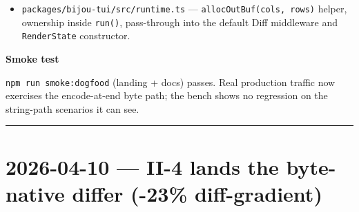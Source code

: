 \begin{itemize}
\item
  \texttt{p\allowbreak{}a\allowbreak{}c\allowbreak{}k\allowbreak{}a\allowbreak{}g\allowbreak{}e\allowbreak{}s\allowbreak{}/\allowbreak{}b\allowbreak{}i\allowbreak{}j\allowbreak{}o\allowbreak{}u\allowbreak{}-\allowbreak{}t\allowbreak{}u\allowbreak{}i\allowbreak{}/\allowbreak{}s\allowbreak{}r\allowbreak{}c\allowbreak{}/\allowbreak{}r\allowbreak{}u\allowbreak{}n\allowbreak{}t\allowbreak{}i\allowbreak{}m\allowbreak{}e\allowbreak{}.\allowbreak{}t\allowbreak{}s} --- \texttt{a\allowbreak{}l\allowbreak{}l\allowbreak{}o\allowbreak{}c\allowbreak{}O\allowbreak{}u\allowbreak{}t\allowbreak{}B\allowbreak{}u\allowbreak{}f\allowbreak{}(\allowbreak{}c\allowbreak{}o\allowbreak{}l\allowbreak{}s\allowbreak{},\allowbreak{} \allowbreak{}r\allowbreak{}o\allowbreak{}w\allowbreak{}s\allowbreak{})} helper, ownership inside \texttt{r\allowbreak{}u\allowbreak{}n\allowbreak{}(\allowbreak{})}, pass-through into the default Diff middleware and \texttt{R\allowbreak{}e\allowbreak{}n\allowbreak{}d\allowbreak{}e\allowbreak{}r\allowbreak{}S\allowbreak{}t\allowbreak{}a\allowbreak{}t\allowbreak{}e} constructor.
\end{itemize}

\textbf{Smoke test}

\texttt{n\allowbreak{}p\allowbreak{}m\allowbreak{} \allowbreak{}r\allowbreak{}u\allowbreak{}n\allowbreak{} \allowbreak{}s\allowbreak{}m\allowbreak{}o\allowbreak{}k\allowbreak{}e\allowbreak{}:\allowbreak{}d\allowbreak{}o\allowbreak{}g\allowbreak{}f\allowbreak{}o\allowbreak{}o\allowbreak{}d} (landing + docs) passes. Real production traffic now exercises the encode-at-end byte path; the bench shows no regression on the string-path scenarios it can see.

\begin{center}\rule{0.5\linewidth}{0.5pt}\end{center}

\section{2026-04-10 --- II-4 lands the byte-native differ (-23\% diff-gradient)}\label{record-422-ii-4-lands-the-byte-native-differ--23-diff-gradient}

